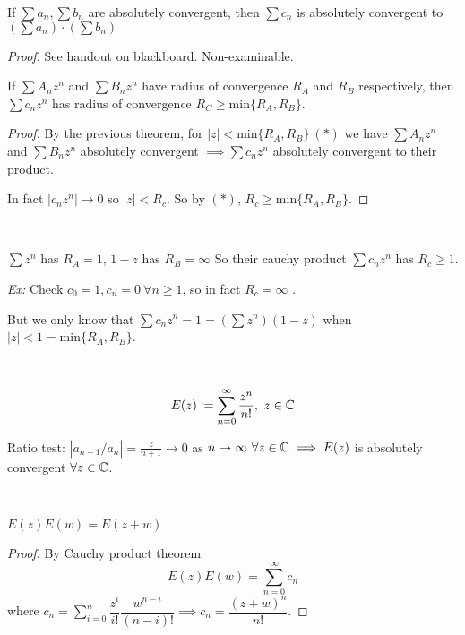 \begin{theorem}  
If $\sum a_n, \sum b_n$ are absolutely convergent, then $\sum c_n$ is absolutely convergent to $(\sum a_n) \cdot (\sum b_n)$	
\end{theorem}
\textit{Proof.}
See handout on blackboard. Non-examinable. \\

\begin{corollary}
If $\sum A_nz^n$ and $\sum B_nz^n$ have radius of convergence $R_A$ and $R_B$ respectively, then $\sum c_nz^n$ has radius of convergence $R_C \geq \mathrm{min}\{R_A,R_B\}$.	
\end{corollary}
\begin{proof}
By the previous theorem, for $|z| < \mathrm{min}\{R_A,R_B\} ~(*)$ we have $\sum A_nz^n$ and $\sum B_nz^n$ absolutely convergent $\implies \sum c_nz^n$ absolutely convergent to their product. 

In fact $|c_nz^n| \to 0$ so $|z| < R_c$. So by $(*)$, $R_c \geq \mathrm{min}\{R_A,R_B\}$.
\end{proof}~

\begin{example}
$\sum z^n$ has $R_A = 1$, $1-z$ has $R_B = \infty$ So their cauchy product $\sum c_nz^n$ has $R_c \geq 1$. 

\emph{Ex:} Check $c_0 = 1, c_n = 0~\forall n \geq 1$, so in fact $R_c = \infty$	.

But we only know that $\sum c_n z^n = 1 = (\sum z^n)(1-z)$ when $|z| < 1 = \mathrm{min}\{R_A,R_B\}$. 
\end{example}~

\vspace*{5pt}

\begin{definition}
\[E(z):= \sum_{n=0}^\infty \frac{z^n}{n!},~z\in\mathbb{C}\]

Ratio test: $|a_{n+1}/a_n| = \frac{z}{n+1} \to 0$ as $n \to \infty ~\forall z \in\mathbb{C}\implies E(z)$ is absolutely convergent $\forall z\in\mathbb{C}$.  
\end{definition}~

\begin{proposition}
$E(z)E(w) = E(z + w)$
\end{proposition}
\begin{proof}
By Cauchy product theorem
\[E(z)E(w) = \sum_{n=0}^\infty c_n\]
where $c_n = \sum_{i=0}^n \dfrac{z^i}{i!}\dfrac{w^{n-i}}{(n-i)!} \implies c_n = \dfrac{(z+w)^n}{n!}$.
\end{proof}

